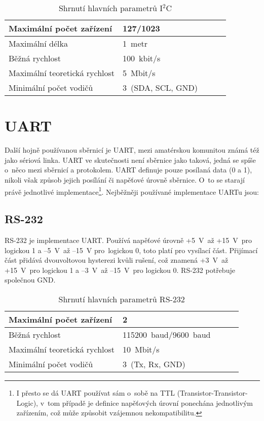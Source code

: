 \begin{table}[h]
		
	\centering
	\begin{tabular}{|l|l|l|l|l|} \hline
		Maximální počet zařízení   & 127/1023          \\ \hline
		Maximální délka               & 1~metr            \\ \hline
		Běžná rychlost                & 100~kbit/s        \\ \hline
		Maximální teoretická rychlost & 5~Mbit/s          \\ \hline
		Minimální počet vodičů      & 3~(SDA, SCL, GND) \\ \hline
	\end{tabular}
	\caption{Shrnutí hlavních parametrů I$^{2}$C}
\end{table}



\section{UART}
Další hojně používanou sběrnicí je UART, mezi amatérskou komunitou známá též jako sériová linka.
UART ve skutečnosti není sběrnice jako taková, jedná se spíše o~něco mezi sběrnicí a protokolem.
UART definuje pouze posílaná data (0 a 1), nikoli však způsob jejich posílání či napěťové úrovně sběrnice.
O~to se starají právě jednotlivé implementace\footnote{I přesto se dá UART používat sám o~sobě na TTL (Transistor-Transistor-Logic), v~tom případě je definice napěťových úrovní ponechána jednotlivým zařízením, což může způsobit vzájemnou nekompatibilitu.}.
Nejběžněji používané implementace UARTu jsou:
\subsection{RS-232} %
RS-232 \cite{RS-232} je implementace UART.
Používá napěťové úrovně +5~V~až +15~V~pro logickou 1 a --5~V~až --15~V   pro~logickou 0, toto platí pro vysílací část.
Přijímací část přidává dvouvoltovou hysterezi kvůli rušení, což znamená +3~V~až +15~V~pro logickou 1 a --3~V~až --15~V~pro logickou 0.
RS-232 potřebuje společnou GND.
\begin{table}[h]
		
	\centering
	\begin{tabular}{|l|l|l|l|l|} \hline
		Maximální počet zařízení   & 2                     \\ \hline
		Běžná rychlost                & 115200~baud/9600~baud \\ \hline
		Maximální teoretická rychlost & 10~Mbit/s             \\ \hline
		Minimální počet vodičů      & 3~(Tx, Rx, GND)       \\ \hline
	\end{tabular}
	\caption{Shrnutí hlavních parametrů RS-232}
\end{table}
